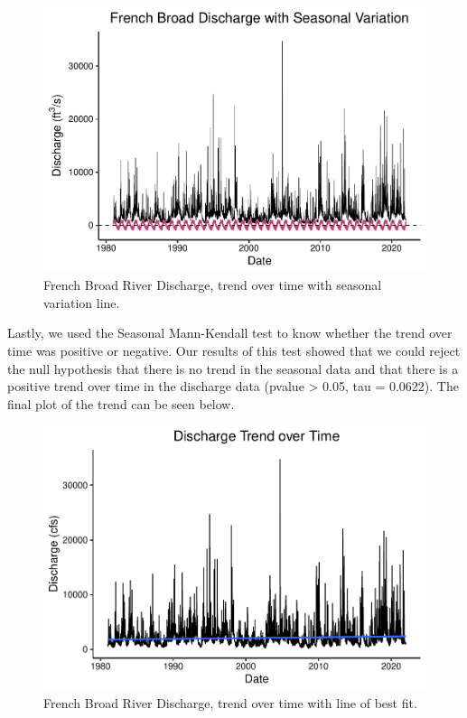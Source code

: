\documentclass[
]{article}
\begin{document}
\begin{figure}
\centering
\includegraphics{SD_AD_NVT_EDAfinal_files/figure-latex/unnamed-chunk-11-1.pdf}
\caption{French Broad River Discharge, trend over time with seasonal
variation line.}
\end{figure}

Lastly, we used the Seasonal Mann-Kendall test to know whether the trend
over time was positive or negative. Our results of this test showed that
we could reject the null hypothesis that there is no trend in the
seasonal data and that there is a positive trend over time in the
discharge data (pvalue \textgreater{} 0.05, tau = 0.0622). The final
plot of the trend can be seen below.

\begin{figure}
\centering
\includegraphics{SD_AD_NVT_EDAfinal_files/figure-latex/unnamed-chunk-12-1.pdf}
\caption{French Broad River Discharge, trend over time with line of best
fit.}
\end{figure}
\end{document}
